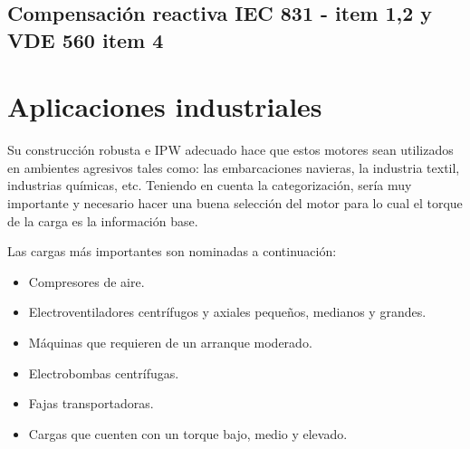 \documentclass[a4paper,11pt]{article}
\begin{document}
\subsection[Compensación reactiva IEC 831 y VDE 560]{Compensación reactiva IEC 831 - item 1,2 y VDE 560 item 4}
\section{Aplicaciones industriales}
Su construcción robusta e IPW adecuado hace que estos motores sean utilizados en ambientes agresivos tales como: las embarcaciones navieras, la industria textil, industrias químicas, etc. Teniendo en cuenta la categorización, sería muy importante y necesario hacer una buena selección del motor para lo cual el torque de la carga es la información base.

Las cargas más importantes son nominadas a continuación:
\begin{itemize}
    \item Compresores de aire.
    \item Electroventiladores centrífugos y axiales pequeños, medianos y grandes.
    \item Máquinas que requieren de un arranque moderado.
    \item Electrobombas centrífugas.
    \item Fajas transportadoras.
    \item Cargas que cuenten con un torque bajo, medio y elevado.
\end{itemize}
\end{document}
